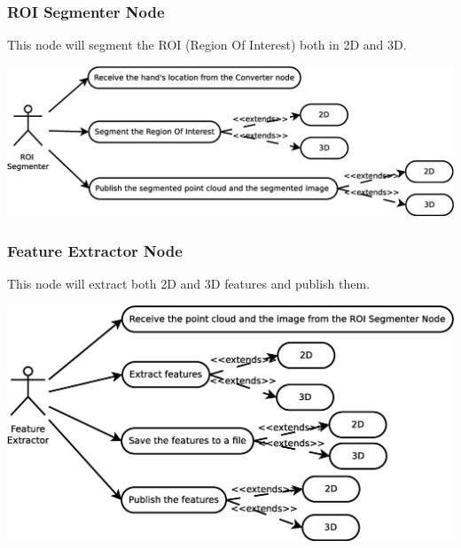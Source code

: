 \documentclass{article}
\begin{document}
\subsubsection{ROI Segmenter Node}
This node will segment the ROI (Region Of Interest) both in 2D and 3D.

\begin{center}
	\includegraphics[scale=0.4]{../diagrams/images/uc_roi_segmenter.eps}
\end{center}

\subsubsection{Feature Extractor Node}
This node will extract both 2D and 3D features and publish them. 

\begin{center}
	\includegraphics[scale=0.4]{../diagrams/images/uc_feature_extractor.eps}
\end{center}
\end{document}
